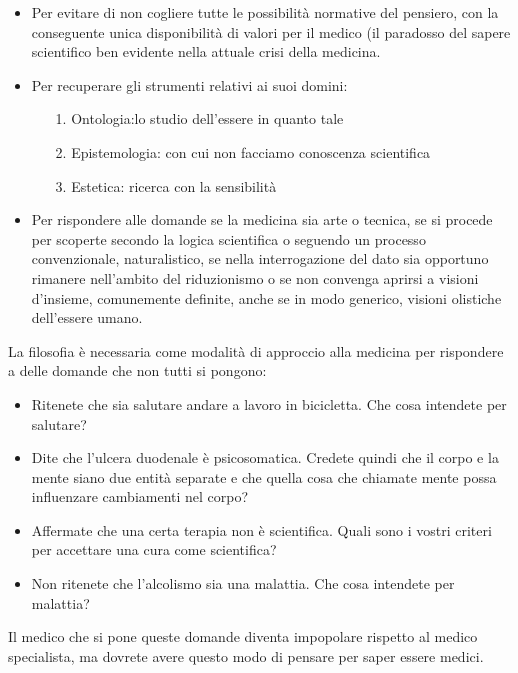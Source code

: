\begin{itemize}
\item
  Per evitare di non cogliere tutte le possibilità normative del
  pensiero, con la conseguente unica disponibilità di valori per il
  medico (il paradosso del sapere scientifico ben evidente nella attuale
  crisi della medicina.

\item
  Per recuperare gli strumenti relativi ai suoi domini:

\begin{itemize}
\item[1.]
  Ontologia:lo studio dell'essere in quanto tale
\item[2.]
  Epistemologia: con cui non facciamo conoscenza scientifica
\item[3.]
  Estetica: ricerca con la sensibilità
\end{itemize}

\item
  Per rispondere alle domande se la medicina sia arte o tecnica, se si
  procede per scoperte secondo la logica scientifica o seguendo un
  processo convenzionale, naturalistico, se nella interrogazione del
  dato sia opportuno rimanere nell'ambito del riduzionismo o se non
  convenga aprirsi a visioni d'insieme, comunemente definite, anche se
  in modo generico, visioni olistiche dell'essere umano.
  \end{itemize}
  
  La filosofia è necessaria come modalità di approccio alla medicina per
  rispondere a delle domande che non tutti si pongono:

\begin{itemize}
\item
  Ritenete che sia salutare andare a lavoro in bicicletta. Che cosa
  intendete per salutare?
\item
  Dite che l'ulcera duodenale è psicosomatica. Credete quindi che il
  corpo e la mente siano due entità separate e che quella cosa che
  chiamate mente possa influenzare cambiamenti nel corpo?
\item
  Affermate che una certa terapia non è scientifica. Quali sono i vostri
  criteri per accettare una cura come scientifica?
\item
  Non ritenete che l'alcolismo sia una malattia. Che cosa intendete per
  malattia?
\end{itemize}
  
  Il medico che si pone queste domande diventa impopolare rispetto al
  medico specialista, ma dovrete avere questo modo di pensare per saper
  essere medici.

